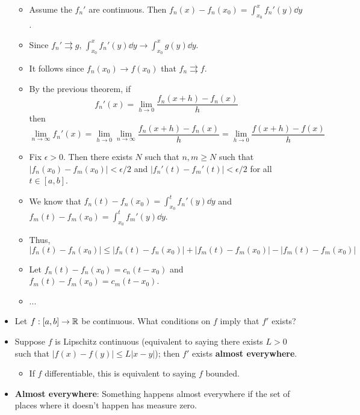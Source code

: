 \documentclass[../../notes.tex]{subfiles}
\begin{document}
\begin{itemize}
    \begin{itemize}
        \item Assume the $f_n'$ are continuous. Then $f_n(x)-f_n(x_0)=\int_{x_0}^xf_n'(y)\dd{y}$.
        \item Since $f_n'\rightrightarrows g$, $\int_{x_0}^xf_n'(y)\dd{y}\to\int_{x_0}^xg(y)\dd{y}$.
        \item It follows since $f_n(x_0)\to f(x_0)$ that $f_n\rightrightarrows f$.
        \item By the previous theorem, if
        \begin{equation*}
            f_n'(x) = \lim_{h\to 0}\frac{f_n(x+h)-f_n(x)}{h}
        \end{equation*}
        then
        \begin{equation*}
            \lim_{n\to\infty}f_n'(x) = \lim_{h\to 0}\lim_{n\to\infty}\frac{f_n(x+h)-f_n(x)}{h} = \lim_{h\to 0}\frac{f(x+h)-f(x)}{h}
        \end{equation*}
        \item Fix $\epsilon>0$. Then there exists $N$ such that $n,m\geq N$ such that $|f_n(x_0)-f_m(x_0)|<\epsilon/2$ and $|f_n'(t)-f_m'(t)|<\epsilon/2$ for all $t\in[a,b]$.
        \item We know that $f_n(t)-f_n(x_0)=\int_{x_0}^tf_n'(y)\dd{y}$ and $f_m(t)-f_m(x_0)=\int_{x_0}^tf_m'(y)\dd{y}$.
        \item Thus,
        \begin{equation*}
            |f_n(t)-f_n(x_0)| \leq |f_n(t)-f_n(x_0)|+|f_m(t)-f_m(x_0)|-|f_m(t)-f_m(x_0)|
        \end{equation*}
        \item Let $f_n(t)-f_n(x_0)=c_n(t-x_0)$ and $f_m(t)-f_m(x_0)=c_m(t-x_0)$.
        \item ...
    \end{itemize}
    \item Let $f:[a,b]\to\mathbb{R}$ be continuous. What conditions on $f$ imply that $f'$ exists?
    \item Suppose $f$ is Lipschitz continuous (equivalent to saying there exists $L>0$ such that $|f(x)-f(y)|\leq L|x-y|$); then $f'$ exists \textbf{almost everywhere}.
    \begin{itemize}
        \item If $f$ differentiable, this is equivalent to saying $f$ bounded.
    \end{itemize}
    \item \textbf{Almost everywhere}: Something happens almost everywhere if the set of places where it doesn't happen has measure zero.

\end{itemize}
\end{document}
